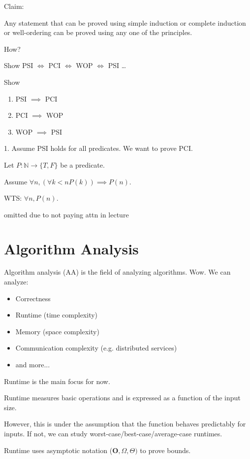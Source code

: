 \documentclass{article}
\newcommand{\N}{\mathbb{N}}
\begin{document}
\hrulefill

Claim:

Any statement that can be proved using simple induction or complete induction or well-ordering can be proved using any one of the principles.

How?

Show PSI $\iff$ PCI $\iff$ WOP $\iff$ PSI \dots

Show
\begin{enumerate}
    \item PSI $\implies$ PCI
    \item PCI $\implies$ WOP
    \item WOP $\implies$ PSI
\end{enumerate}

1. Assume PSI holds for all predicates. We want to prove PCI.

Let $P: \N \to \{T, F\}$ be a predicate.

Assume $\forall n, (\forall k < n P(k)) \implies P(n)$.

WTS: $\forall n, P(n)$.

omitted due to not paying attn in lecture

\pagebreak

\section{Algorithm Analysis}
\onehalfspacing

Algorithm analysis (AA) is the field of analyzing algorithms. Wow. We can analyze:

\begin{itemize}
    \item Correctness
    \item Runtime (time complexity)
    \item Memory (space complexity)
    \item Communication complexity (e.g. distributed services)
    \item and more...
\end{itemize}

Runtime is the main focus for now.

Runtime measures basic operations and is expressed as a function of the input size.

However, this is under the assumption that the function behaves predictably for inputs. If not, we can study worst-case/best-case/average-case runtimes.

Runtime uses asymptotic notation ($\textbf{O}, \Omega, \Theta)$ to prove bounds.
\end{document}
